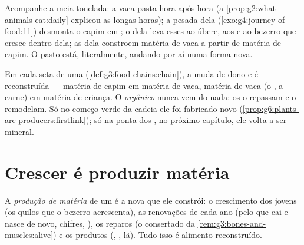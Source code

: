 \begin{example}\label{ex:g6:matter-from-food:cow}
Acompanhe a meia tonelada: a vaca pasta hora após hora (a
\cref{prop:g2:what-animals-eat:daily} explicou as longas horas); a
 pesada dela (\cref{exo:g4:journey-of-food:11}) desmonta o
capim em ; o  dela leva esses  ao úbere, aos
 e ao bezerro que cresce dentro dela; as  dela
constroem matéria de vaca a partir de matéria de capim. O pasto está,
literalmente, andando por aí numa forma nova.
\end{example}

\begin{remark}\label{rem:g6:matter-from-food:hands}
Em cada seta de uma 
(\cref{def:g3:food-chains:chain}), a  muda de dono e
é reconstruída --- matéria de capim em matéria de vaca, matéria de
vaca (o , a carne) em matéria de criança. O \emph{orgânico}
nunca vem do nada: os  o repassam e o remodelam. Só no
começo verde da cadeia ele foi fabricado novo
(\cref{prop:g6:plants-are-producers:firstlink}); só na ponta dos
, no próximo capítulo, ele volta a ser mineral.
\end{remark}

\section{Crescer é produzir matéria}

\begin{definition}\label{def:g6:matter-from-food:production}
A \emph{produção de matéria} de um 
é a  nova que ele constrói: o crescimento dos jovens
(os quilos que o bezerro acrescenta), as renovações de cada ano (pelo que
cai e nasce de novo, chifres, ), os reparos (o  consertado
da \cref{rem:g3:bones-and-muscles:alive}) e os produtos (, ,
lã). Tudo isso é alimento reconstruído.
\end{definition}

